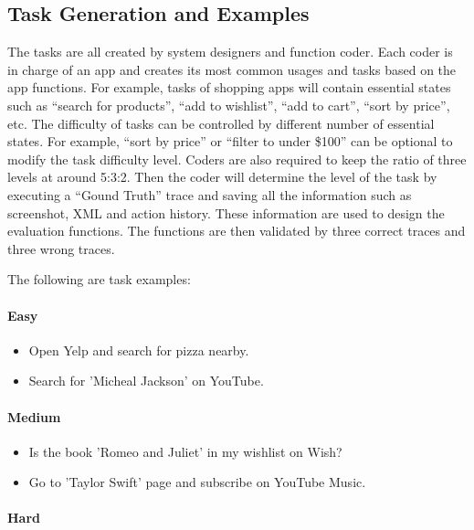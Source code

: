 \documentclass[11pt]{article}
\begin{document}
\subsection{Task Generation and Examples}
\label{app:task-gen-eg}

The tasks are all created by system designers and function coder. Each coder is in charge of an app and creates its most common usages and tasks based on the app functions. For example, tasks of shopping apps will contain essential states such as ``search for products'', ``add to wishlist'', ``add to cart'', ``sort by price'', etc. The difficulty of tasks can be controlled by different number of essential states. For example, ``sort by price'' or ``filter to under \$100'' can be optional to modify the task difficulty level. Coders are also required to keep the ratio of three levels at around 5:3:2. Then the coder will determine the level of the task by executing a ``Gound Truth'' trace and saving all the information such as screenshot, XML and action history. These information are used to design the evaluation functions. The functions are then validated by three correct traces and three wrong traces.

The following are task examples:

\paragraph{Easy}

\begin{itemize}[leftmargin=5mm]
    \item Open Yelp and search for pizza nearby.
    \item Search for 'Micheal Jackson' on YouTube.
\end{itemize}

\paragraph{Medium}

\begin{itemize}[leftmargin=5mm]
    \item Is the book 'Romeo and Juliet' in my wishlist on Wish?
    \item Go to 'Taylor Swift' page and subscribe on YouTube Music.
\end{itemize}

\paragraph{Hard}
\end{document}

